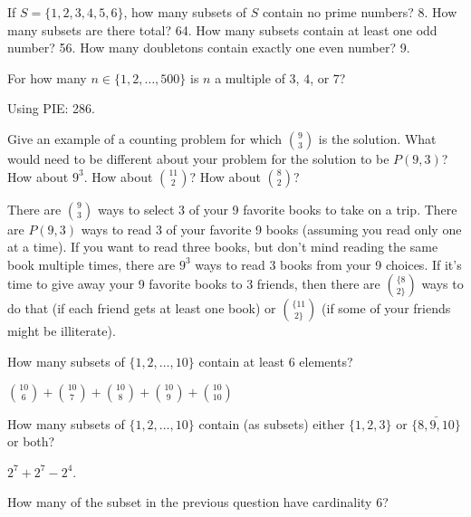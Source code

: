 \begin{squestions}
  \begin{answer}
   If $S = \{1, 2, 3, 4, 5, 6\}$, how many subsets of $S$ contain no prime numbers? 8.  How many subsets are there total? 64. How many subsets contain at least one odd number? 56.  How many doubletons contain exactly one even number? 9.
  \end{answer}

  

\question For how many $n \in \{1,2, \ldots, 500\}$ is $n$ a multiple of $3$, $4$, or $7$?

\begin{answer}
 Using PIE: 286.
\end{answer}





\question Give an example of a counting problem for which ${9\choose 3}$ is the solution.  What would need to be different about your problem for the solution to be $P(9,3)$?  How about $9^3$.  How about ${11 \choose 2}$?  How about ${8 \choose 2}$?

  \begin{answer}
   There are ${9 \choose 3}$ ways to select 3 of your 9 favorite books to take on a trip.  There are $P(9,3)$ ways to read 3 of your favorite 9 books (assuming you read only one at a time).  If you want to read three books, but don't mind reading the same book multiple times, there are $9^3$ ways to read 3 books from your 9 choices.  If it's time to give away your 9 favorite books to 3 friends, then there are $\{8 \choose 2\}$ ways to do that (if each friend gets at least one book) or $\{11 \choose 2\}$ (if some of your friends might be illiterate).
  \end{answer}


\question How many subsets of $\{1,2,\ldots, 10\}$ contain at least 6 elements?

  \begin{answer}
   ${10 \choose 6} + {10 \choose 7} + {10 \choose 8} + {10 \choose 9} + {10 \choose 10}$
  \end{answer}


\question How many subsets of $\{1,2,\ldots, 10\}$ contain (as subsets) either $\{1,2,3\}$ or $\bar{\{8,9,10\}}$ or both?

  \begin{answer}
   $2^7 + 2^7 - 2^4$.
  \end{answer}


\question How many of the subset in the previous question have cardinality 6?


\end{squestions}
